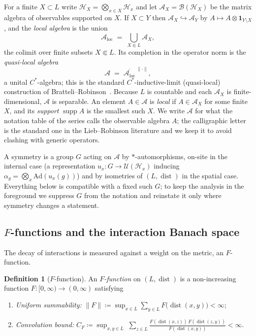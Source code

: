 \documentclass[12pt]{article}
\newcommand{\Ffun}{F}                          %
\newcommand{\qA}{\mathcal{A}}
\newcommand{\norm}[1]{\lVert #1\rVert}
\newcommand{\loc}{\mathrm{loc}}
\newcommand{\supp}{\operatorname{supp}}
\newcommand{\dist}{\operatorname{dist}}
\newcommand{\eqdef}{\coloneqq}
\theoremstyle{definition}
\newtheorem{definition}[theorem]{Definition}
\theoremstyle{remark}
\begin{document}
For a finite $X\subset L$ write $\mathcal H_X=\bigotimes_{x\in X}\mathcal H_x$ and let
$\qA_X=\mathcal B(\mathcal H_X)$ be the matrix algebra of observables supported on $X$. If
$X\subset Y$ then $\qA_X\hookrightarrow\qA_Y$ by $A\mapsto A\otimes\mathbf 1_{Y\setminus X}$,
and the \emph{local algebra} is the union
\[
  \qA_\loc \;=\; \bigcup_{X\Subset L}\qA_X,
\]
the colimit over finite subsets $X\Subset L$. Its completion in the operator norm is the
\emph{quasi-local algebra}
\[
  \qA \;=\; \overline{\qA_\loc}^{\,\norm{\cdot}},
\]
a unital $C^*$-algebra; this is the standard $C^*$-inductive-limit (quasi-local) construction
of Bratteli--Robinson~\cite{bratteli-robinson-1}. Because $L$ is countable and each $\qA_X$ is
finite-dimensional, $\qA$ is separable. An element $A\in\qA$ is \emph{local} if $A\in\qA_X$ for some finite $X$,
and its \emph{support} $\supp A$ is the smallest such $X$. We write $\qA$ for what the
notation table of the series calls the observable algebra $A$; the calligraphic letter is the
standard one in the Lieb--Robinson literature and we keep it to avoid clashing with generic
operators.

A symmetry is a group $G$ acting on $\qA$ by $*$-automorphisms, on-site in the internal case
(a representation $u_x:G\to\mathcal U(\mathcal H_x)$ inducing $\alpha_g=\bigotimes_x
\mathrm{Ad}(u_x(g))$) and by isometries of $(L,\dist)$ in the spatial case. Everything below
is compatible with a fixed such $G$; to keep the analysis in the foreground we suppress $G$
from the notation and reinstate it only where symmetry changes a statement.

\subsection{\texorpdfstring{$\Ffun$}{F}-functions and the interaction Banach space}
\label{sec:framework-Ffun}

The decay of interactions is measured against a weight on the metric, an $\Ffun$-function.

\begin{definition}[$\Ffun$-function]
\label{def:Ffun}
An \emph{$\Ffun$-function} on $(L,\dist)$ is a non-increasing function
$\Ffun:[0,\infty)\to(0,\infty)$ satisfying
\begin{enumerate}
\item[(F1)] \emph{Uniform summability:}
  $\displaystyle \norm{\Ffun}\eqdef\sup_{x\in L}\sum_{y\in L}\Ffun\bigl(\dist(x,y)\bigr)<\infty$;
\item[(F2)] \emph{Convolution bound:}
  $\displaystyle C_\Ffun\eqdef\sup_{x,y\in L}\;\sum_{z\in L}
   \frac{\Ffun(\dist(x,z))\,\Ffun(\dist(z,y))}{\Ffun(\dist(x,y))}<\infty.$
\end{enumerate}
\end{definition}
\end{document}
